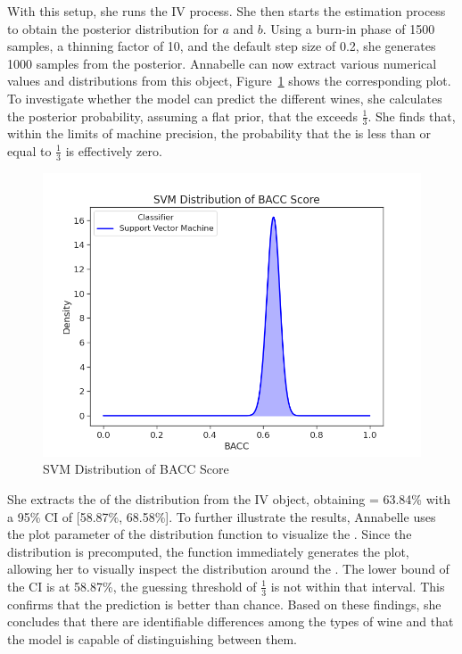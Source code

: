 \documentclass[article]{jss}
\begin{document}
With this setup, she runs the IV process.
She then starts the estimation process to obtain the posterior distribution for $a$ and $b$.
Using a burn-in phase of 1500 samples, a thinning factor of 10, and the default step size of 0.2, she generates 1000 samples from the posterior.
Annabelle can now extract various numerical values and distributions from this object, Figure~\ref{fig:svmclassifier} shows the corresponding plot.
To investigate whether the model can predict the different wines, she calculates the posterior probability, assuming a flat prior, that the  exceeds $\frac{1}{3}$. She finds that, within the limits of machine precision, the probability that the  is less than or equal to $\frac{1}{3}$ is effectively zero.

\begin{figure}[t!]
\centering
\includegraphics{plots/figure1.png}
\caption{SVM Distribution of BACC Score}\label{fig:svmclassifier}
\end{figure}

She extracts the  of the distribution from the IV object, obtaining  = 63.84\% with a 95\% CI of [58.87\%, 68.58\%].
To further illustrate the results, Annabelle uses the plot parameter of the distribution function to visualize the .
Since the distribution is precomputed, the function immediately generates the plot, allowing her to visually inspect the distribution around the .
The lower bound of the CI is at 58.87\%, the guessing threshold of $\frac{1}{3}$ is not within that interval. This confirms that the prediction is better than chance.
Based on these findings, she concludes that there are identifiable differences among the types of wine and that the model is capable of distinguishing between them.
\end{document}
